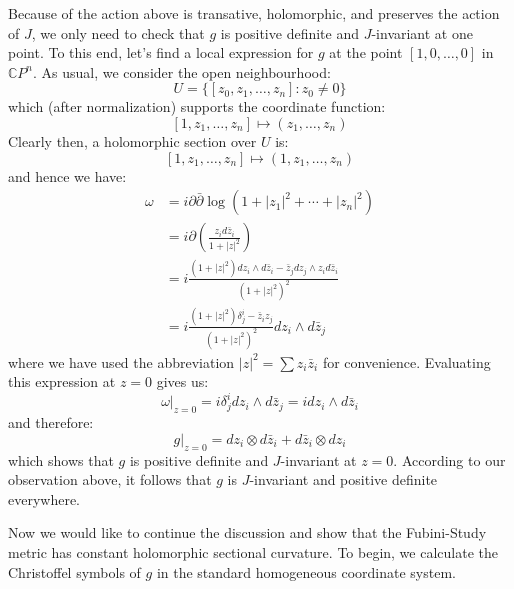\documentclass[11pt]{amsart}
\theoremstyle{definition}
\def \CP{ \mathbb{C}P }
\def \del{ \partial }
\def \delbar{ \bar{\partial} }
\begin{document}
Because of the action above is transative, holomorphic, and preserves the action of $J$, we only need to check that $g$ is positive definite and $J$-invariant at one point.  To this end, let's find a local expression for $g$ at the point $[1,0, \ldots, 0]$ in $\CP^n$.  As usual, we consider the open neighbourhood:
%
$$U = \{ [z_0,z_1, \ldots, z_n]: z_0 \neq 0 \} $$
%
which (after normalization) supports the coordinate function:
%
$$[1,z_1, \ldots, z_n] \mapsto (z_1, \ldots, z_n)$$
%
Clearly then, a holomorphic section over $U$ is:
%
$$[1,z_1, \ldots, z_n] \mapsto (1,z_1, \ldots, z_n)$$
%
and hence we have:
%
\begin{align*}
\omega &= i \del \delbar \log( 1 + |z_1|^2 + \cdots + |z_n|^2 ) \\
&= i \del \left( \frac{ z_i d\bar{z}_i }{ 1 + |z|^2 } \right) \\
&= i \frac{ (1 + |z|^2 ) dz_i \wedge d \bar{z}_i - \bar{z}_j d z_j \wedge z_i d \bar{z}_i }{ (1 + |z|^2 )^2 } \\
&= i \frac{ (1 + |z|^2)\delta^i_j - \bar{z}_i z_j }{ (1 + |z|^2)^2 } d z_i \wedge d \bar{z}_j
\end{align*}
%
where we have used the abbreviation $|z|^2 = \sum z_i \bar{z}_i$ for convenience.  Evaluating this expression at $z=0$ gives us:
%
$$ \omega|_{z=0} = i \delta^i_j dz_i \wedge d \bar{z}_j = i dz_i \wedge d \bar{z}_i $$
%
and therefore:
%
$$ g|_{z=0} = dz_i \otimes d \bar{z}_i + d \bar{z}_i \otimes d z_i $$
%
which shows that $g$ is positive definite and $J$-invariant at $z=0$.  According to our observation above, it follows that $g$ is $J$-invariant and positive definite everywhere.

Now we would like to continue the discussion and show that the Fubini-Study metric has constant holomorphic sectional curvature.  To begin, we calculate the Christoffel symbols of $g$ in the standard homogeneous coordinate system.  
\end{document}
